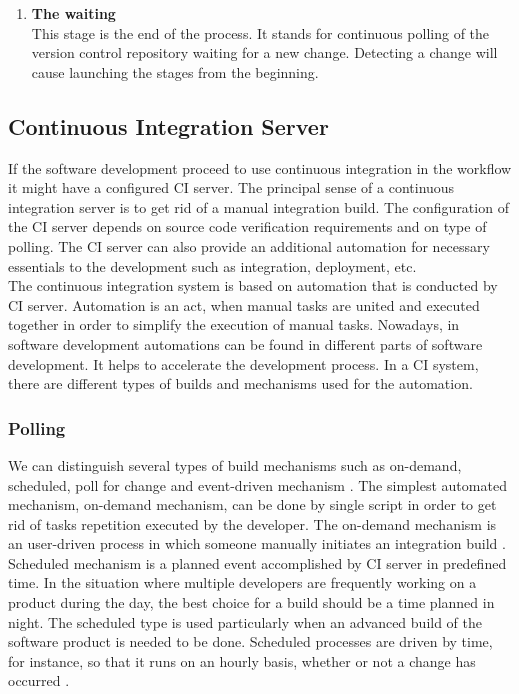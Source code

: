 \begin{enumerate}
	\item \textbf{The waiting}\\[0.1em]
		  This stage is the end of the process. It stands for continuous polling of  the version control repository waiting for a new change. Detecting a change will cause launching the stages from the beginning.

\end{enumerate}

\subsection{Continuous Integration Server}

If the software development proceed to use continuous integration in the workflow it might have a configured CI server. The principal sense of a continuous integration server is to get rid of a manual integration build. The configuration of the CI server depends on source code verification requirements and on type of polling. The CI server can also provide an additional automation for necessary essentials to the development such as integration, deployment, etc.\\

The continuous integration system is based on automation that is conducted by CI server. Automation is an act, when manual tasks are united and executed together in order to simplify the execution of manual tasks. Nowadays, in software development automations can be found in different parts of software development. It helps to accelerate the development process. In a CI system, there are different types of builds and mechanisms used for the automation.

\subsubsection{Polling}

We can distinguish several types of build mechanisms such as on-demand, scheduled, poll for change and event-driven mechanism \cite{CIbook}. The simplest automated mechanism, on-demand mechanism, can be done by single script in order to get rid of tasks repetition executed by the developer. The on-demand mechanism is an user-driven process in which someone manually initiates an integration build \cite{CIbook}. Scheduled mechanism is a planned event accomplished by CI server in predefined time. In the situation where multiple developers are frequently working on a product during the day, the best choice for a build should be a time planned in night. The scheduled type is used particularly when an advanced build of the software product is needed to be done. Scheduled processes are driven by time, for instance, so that it runs on an hourly basis, whether or not a change has occurred \cite{CIbook}.\\

